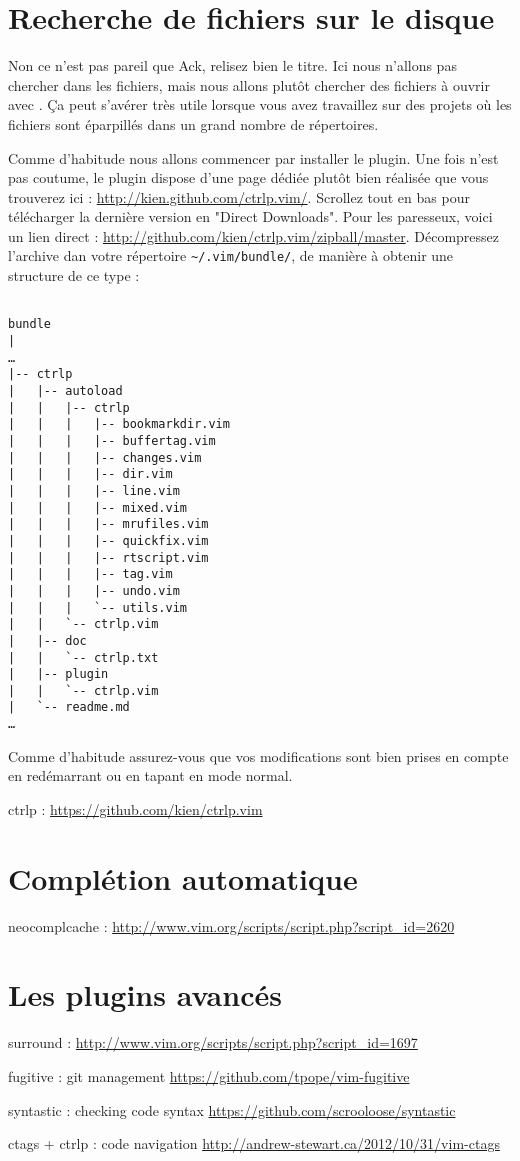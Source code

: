 \section{Recherche de fichiers sur le disque}

Non ce n'est pas pareil que Ack, relisez bien le titre. Ici nous n'allons pas chercher dans les fichiers, mais nous allons plutôt chercher des fichiers à ouvrir avec \vim. Ça peut s'avérer très utile lorsque vous avez travaillez sur des projets où les fichiers sont éparpillés dans un grand nombre de répertoires.

Comme d'habitude nous allons commencer par installer le plugin. Une fois n'est pas coutume, le plugin dispose d'une page dédiée plutôt bien réalisée que vous trouverez ici : \url{http://kien.github.com/ctrlp.vim/}. Scrollez tout en bas pour télécharger la dernière version en "Direct Downloads". Pour les paresseux, voici un lien direct : \url{http://github.com/kien/ctrlp.vim/zipball/master}. Décompressez l'archive dan votre répertoire \Verb|~/.vim/bundle/|, de manière à obtenir une structure de ce type :

\begin{verbatim}

bundle
|
…
|-- ctrlp
|   |-- autoload
|   |   |-- ctrlp
|   |   |   |-- bookmarkdir.vim
|   |   |   |-- buffertag.vim
|   |   |   |-- changes.vim
|   |   |   |-- dir.vim
|   |   |   |-- line.vim
|   |   |   |-- mixed.vim
|   |   |   |-- mrufiles.vim
|   |   |   |-- quickfix.vim
|   |   |   |-- rtscript.vim
|   |   |   |-- tag.vim
|   |   |   |-- undo.vim
|   |   |   `-- utils.vim
|   |   `-- ctrlp.vim
|   |-- doc
|   |   `-- ctrlp.txt
|   |-- plugin
|   |   `-- ctrlp.vim
|   `-- readme.md
…
\end{verbatim}

Comme d'habitude assurez-vous que vos modifications sont bien prises en compte en redémarrant \vim ou en tapant  en mode normal.


ctrlp : \url{https://github.com/kien/ctrlp.vim}

\section{Complétion automatique}

neocomplcache : \url{http://www.vim.org/scripts/script.php?script\_id=2620}

\section{Les plugins avancés}

surround : \url{http://www.vim.org/scripts/script.php?script\_id=1697}

fugitive : git management \url{https://github.com/tpope/vim-fugitive}

syntastic : checking code syntax \url{https://github.com/scrooloose/syntastic}

ctags + ctrlp : code navigation \url{http://andrew-stewart.ca/2012/10/31/vim-ctags}
